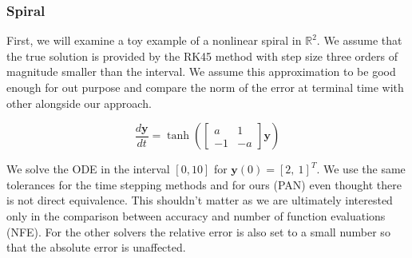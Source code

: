 \documentclass[11pt]{article}
\begin{document}
    \subsubsection{Spiral}
    First, we will examine a toy example of a nonlinear spiral in $\mathbb{R}^{2}$.
    We assume that the true solution is provided by the RK45 method with step size three orders of magnitude smaller than the
    interval.
    We assume this approximation to be good enough for out purpose and compare the norm of the error at terminal time
    with other alongside our approach.

    \begin{equation*}
        \frac{d \pmb{y} }{dt} =
        \tanh(
        \begin{bmatrix}
            a & 1 \\ -1 & -a
        \end{bmatrix}
        \pmb{y}
        )
    \end{equation*}

    We solve the ODE in the interval $[0,10]$ for $\pmb{y}(0) = [2,\ 1]^T$.
    We use the same tolerances for the time stepping methods and for ours (PAN) even thought there is not direct
    equivalence.
    This shouldn't matter as we are ultimately interested only in the comparison between accuracy and number of function
    evaluations (NFE).
    For the other solvers the relative error is also set to a small number so that the absolute error is unaffected.
\end{document}

